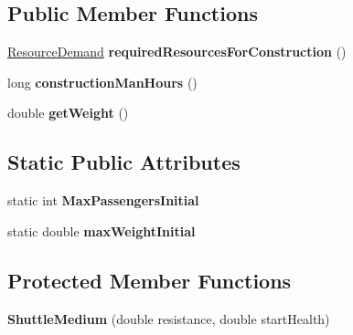 \subsection*{Public Member Functions}
\begin{DoxyCompactItemize}
\item 
\hyperlink{classuniverse_1_1_resource_demand}{Resource\+Demand} {\bfseries required\+Resources\+For\+Construction} ()\hypertarget{classtools_1_1vehicles_1_1space_1_1_shuttle_medium_a1502a3d8f3cddf8a27cd8b963aaab41e}{}\label{classtools_1_1vehicles_1_1space_1_1_shuttle_medium_a1502a3d8f3cddf8a27cd8b963aaab41e}

\item 
long {\bfseries construction\+Man\+Hours} ()\hypertarget{classtools_1_1vehicles_1_1space_1_1_shuttle_medium_a9f37b91f5325a199e4d14f4e1249e00d}{}\label{classtools_1_1vehicles_1_1space_1_1_shuttle_medium_a9f37b91f5325a199e4d14f4e1249e00d}

\item 
double {\bfseries get\+Weight} ()\hypertarget{classtools_1_1vehicles_1_1space_1_1_shuttle_medium_a74cd2db93cb472e8d0da25d46790617a}{}\label{classtools_1_1vehicles_1_1space_1_1_shuttle_medium_a74cd2db93cb472e8d0da25d46790617a}

\end{DoxyCompactItemize}
\subsection*{Static Public Attributes}
\begin{DoxyCompactItemize}
\item 
static int {\bfseries Max\+Passengers\+Initial}\hypertarget{classtools_1_1vehicles_1_1space_1_1_shuttle_medium_a1734aa9ff7d1e2b8e6bef0f5dc4e3cc1}{}\label{classtools_1_1vehicles_1_1space_1_1_shuttle_medium_a1734aa9ff7d1e2b8e6bef0f5dc4e3cc1}

\item 
static double {\bfseries max\+Weight\+Initial}\hypertarget{classtools_1_1vehicles_1_1space_1_1_shuttle_medium_afb705ed7c2a6038c8ac4af87f7a0cee2}{}\label{classtools_1_1vehicles_1_1space_1_1_shuttle_medium_afb705ed7c2a6038c8ac4af87f7a0cee2}

\end{DoxyCompactItemize}
\subsection*{Protected Member Functions}
\begin{DoxyCompactItemize}
\item 
{\bfseries Shuttle\+Medium} (double resistance, double start\+Health)\hypertarget{classtools_1_1vehicles_1_1space_1_1_shuttle_medium_a5e050c7a849d504da5340818c950633e}{}\label{classtools_1_1vehicles_1_1space_1_1_shuttle_medium_a5e050c7a849d504da5340818c950633e}

\end{DoxyCompactItemize}
